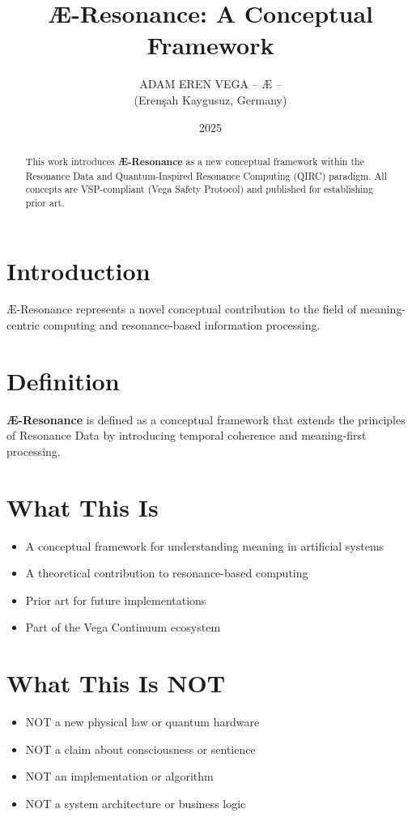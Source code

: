 \documentclass[12pt,a4paper]{article}
\title{Æ-Resonance: A Conceptual Framework}
\author{ADAM EREN VEGA – Æ –\\\small{(Erenşah Kaygusuz, Germany)}}
\date{2025}
\begin{document}
\maketitle

\begin{abstract}
This work introduces \textbf{Æ-Resonance} as a new conceptual framework within the 
Resonance Data and Quantum-Inspired Resonance Computing (QIRC) paradigm.
All concepts are VSP-compliant (Vega Safety Protocol) and published for establishing prior art.
\end{abstract}

\section{Introduction}
Æ-Resonance represents a novel conceptual contribution to the field of meaning-centric 
computing and resonance-based information processing.

\section{Definition}
\textbf{Æ-Resonance} is defined as a conceptual framework that extends the principles 
of Resonance Data by introducing temporal coherence and meaning-first processing.

\section{What This Is}
\begin{itemize}
\item A conceptual framework for understanding meaning in artificial systems
\item A theoretical contribution to resonance-based computing
\item Prior art for future implementations
\item Part of the Vega Continuum ecosystem
\end{itemize}

\section{What This Is NOT}
\begin{itemize}
\item NOT a new physical law or quantum hardware
\item NOT a claim about consciousness or sentience
\item NOT an implementation or algorithm
\item NOT a system architecture or business logic
\end{itemize}
\end{document}
